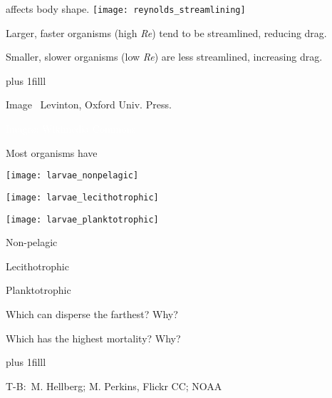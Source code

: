 \documentclass[t]{beamer}
\begin{document}
\begin{frame}[t]{ affects body shape.}
	\texttt{[image: reynolds\_streamlining]}
	\begin{multicols}{2}
		\hangpara Larger, faster organisms (high \textit{Re}) tend to be streamlined, reducing drag.

		\columnbreak

		\hangpara Smaller, slower organisms (low \textit{Re}) are less streamlined, increasing drag.

	\end{multicols}

\vskip0pt plus 1filll

\tiny Image \textcopyright\, Levinton, Oxford Univ. Press.
\end{frame}

{
\begin{frame}[b]
\hspace*{60mm}\tiny\textcolor{white}{Images: Wikimedia Commons}
\end{frame}
}

\begin{frame}[t]{Most organisms have }
	\begin{multicols}{2}

	\begin{center}
		\texttt{[image: larvae\_nonpelagic]}
		
		\texttt{[image: larvae\_lecithotrophic]}

		\texttt{[image: larvae\_planktotrophic]}
	\end{center}	
	\columnbreak
	
		Non-pelagic
		
		Lecithotrophic
		
		Planktotrophic
		
		\vspace*{\baselineskip}
		
		Which can disperse the farthest? Why?		
		
		\vspace*{\baselineskip}
		
		Which has the highest mortality? Why?
	
	\end{multicols}
	
	\vskip0pt plus 1filll
	
	\tiny T-B: \textcopyright\,M. Hellberg; M. Perkins, Flickr CC; NOAA
\end{frame}
\end{document}
